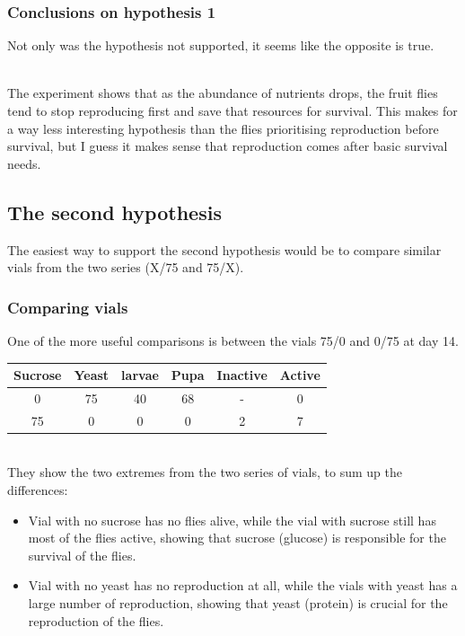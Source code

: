 \documentclass{article}
\begin{document}
\subsubsection{Conclusions on hypothesis 1}
Not only was the hypothesis not supported, it seems like the opposite is true.

\noindent\\
The experiment shows that as the abundance of nutrients drops, the fruit flies tend to stop reproducing first and save that resources for survival. This makes for a way less interesting hypothesis than the flies prioritising reproduction before survival, but I guess it makes sense that reproduction comes after basic survival needs.

\subsection{The second hypothesis}

The easiest way to support the second hypothesis would be to compare similar vials from the two series (X/75 and 75/X).

\subsubsection{Comparing vials}

One of the more useful comparisons is between the vials 75/0 and 0/75 at day 14.\\

{
\centering
\begin{tabular}{|c|c|c|c|c|c|}
  \hline
  Sucrose & Yeast & larvae & Pupa & Inactive & Active\\
  \hline
  \hline
  0 & 75 & 40 & 68 & - & 0\\
  75 & 0 & 0 & 0 & 2 & 7\\
  \hline
\end{tabular}
\par
}

\noindent\\
They show the two extremes from the two series of vials, to sum up the differences:

\begin{itemize}
  \item Vial with no sucrose has no flies alive, while the vial with sucrose still has most of the flies active, showing that sucrose (glucose) is responsible for the survival of the flies.
  \item Vial with no yeast has no reproduction at all, while the vials with yeast has a large number of reproduction, showing that yeast (protein) is crucial for the reproduction of the flies.
\end{itemize}
\end{document}
